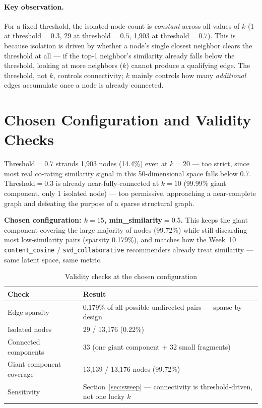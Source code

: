 \documentclass[12pt,a4paper]{article}
\begin{document}
\paragraph{Key observation.} For a fixed threshold, the isolated-node count is \emph{constant}
across all values of $k$ (1 at threshold$=0.3$, 29 at threshold$=0.5$, 1,903 at threshold$=0.7$).
This is because isolation is driven by whether a node's single closest neighbor clears the
threshold at all --- if the top-1 neighbor's similarity already falls below the threshold, looking
at more neighbors ($k$) cannot produce a qualifying edge. The threshold, not $k$, controls
connectivity; $k$ mainly controls how many \emph{additional} edges accumulate once a node is
already connected.

\section{Chosen Configuration and Validity Checks}

Threshold$=0.7$ strands 1,903 nodes (14.4\%) even at $k=20$ --- too strict, since most real
co-rating similarity signal in this 50-dimensional space falls below 0.7. Threshold$=0.3$ is
already near-fully-connected at $k=10$ (99.99\% giant component, only 1 isolated node) --- too
permissive, approaching a near-complete graph and defeating the purpose of a sparse structural
graph.

\textbf{Chosen configuration: $k=15$, min\_similarity$=0.5$.} This keeps the giant component
covering the large majority of nodes (99.72\%) while still discarding most low-similarity pairs
(sparsity 0.179\%), and matches how the Week~10 \texttt{content\_cosine} /
\texttt{svd\_collaborative} recommenders already treat similarity --- same latent space, same
metric.

\begin{table}[H]
\centering
\caption{Validity checks at the chosen configuration}
\begin{tabular}{ll}
\toprule
\textbf{Check} & \textbf{Result} \\
\midrule
Edge sparsity & 0.179\% of all possible undirected pairs --- sparse by design \\
Isolated nodes & 29 / 13,176 (0.22\%) \\
Connected components & 33 (one giant component + 32 small fragments) \\
Giant component coverage & 13,139 / 13,176 nodes (99.72\%) \\
Sensitivity & Section~\ref{sec:sweep} --- connectivity is threshold-driven, not one lucky $k$ \\
\bottomrule
\end{tabular}
\end{table}
\end{document}
